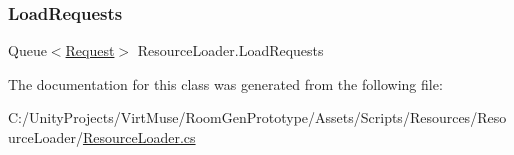 \mbox{\label{class_resource_loader_acd6d1957bdc4e0212991af05e3454633}} 
\subsubsection{\texorpdfstring{Load\+Requests}{LoadRequests}}
{\footnotesize\ttfamily Queue$<$\mbox{\hyperlink{struct_resource_loader_1_1_request}{Request}}$>$ Resource\+Loader.\+Load\+Requests\hspace{0.3cm}{\ttfamily [private]}}



The documentation for this class was generated from the following file\+:\begin{DoxyCompactItemize}
\item 
C\+:/\+Unity\+Projects/\+Virt\+Muse/\+Room\+Gen\+Prototype/\+Assets/\+Scripts/\+Resources/\+Resource\+Loader/\mbox{\hyperlink{_resource_loader_8cs}{Resource\+Loader.\+cs}}\end{DoxyCompactItemize}
